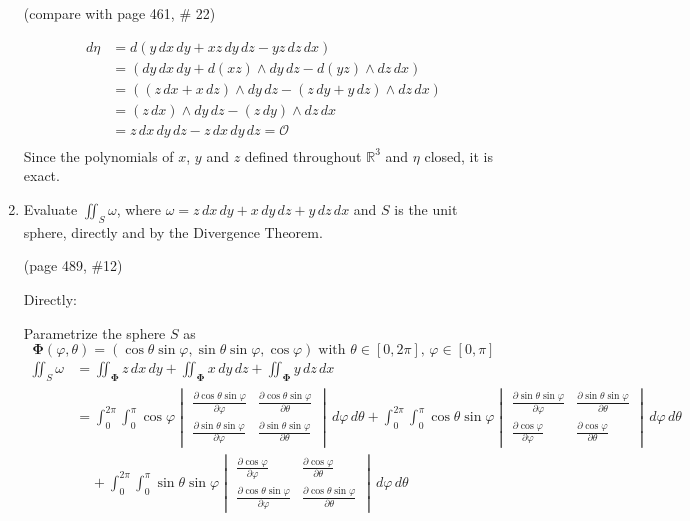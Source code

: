 \documentclass{article}
\newcommand{\partis}[2]{\frac{\partial #2}{\partial #1}}
\begin{document}
\begin{enumerate}
    (compare with page 461, \# 22)

    \begin{align*}
        d\eta &= d (y\, dx \, dy + xz \, dy \, dz - yz \, dz \, dx) \\
        &= (dy \, dx \, dy + d(xz)\wedge  dy \, dz - d(yz) \wedge dz \, dx) \\
        &= ((z \, dx + x \, dz)\wedge  dy \, dz - (z\, dy + y \, dz) \wedge dz \, dx) \\
        &= (z \, dx) \wedge dy \, dz - (z\, dy) \wedge dz \, dx \\
        &= z \, dx \, dy \, dz - z \, dx \, dy \, dz = \mathcal{O}\\
    \end{align*}
    Since the polynomials of $x$, $y$ and $z$ defined throughout $\mathbb{R}^3$ and $\eta$ closed, it is exact.
    \newpage
    \item
    Evaluate $\displaystyle \iint_S \omega$, where $\omega = z\, dx \, dy + x \, dy \, dz + y \, dz \, dx$ and $S$ is the unit sphere, directly and by the Divergence Theorem.

    (page 489, \#12)

    Directly: 
    
    Parametrize the sphere $S$ as 
    \[ \boldsymbol \Phi (\varphi, \theta) = ( \cos\theta \sin\varphi , \sin\theta \sin\varphi, \cos\varphi)\; \text{with }\theta \in [0,2\pi],\, \varphi \in [0,\pi] \]
    \begin{align*}
        \iint_S \omega &= \iint_{\boldsymbol \Phi} z \, dx \, dy + \iint_{\boldsymbol \Phi} x \, dy \, dz + \iint_{\boldsymbol \Phi} y \, dz \, dx \\
        &= \int_0^{2\pi} \int_0^{\pi} \cos \varphi \begin{vmatrix}\partis{\varphi}{\cos\theta \sin \varphi} & \partis{\theta}{\cos\theta \sin \varphi} \\ \partis{\varphi}{\sin\theta \sin\varphi} & \partis{\theta}{\sin\theta \sin\varphi} \end{vmatrix} \, d\varphi \, d\theta + \int_0^{2\pi} \int_0^{\pi} \cos\theta \sin\varphi \begin{vmatrix} \partis{\varphi}{\sin\theta \sin\varphi} & \partis{\theta}{\sin\theta \sin\varphi} \\ \partis{\varphi}{\cos \varphi} & \partis{\theta}{\cos \varphi} \end{vmatrix}\, d\varphi \, d\theta \\
        & \; \; \; \; + \int_0^{2\pi} \int_0^{\pi} \sin\theta \sin\varphi \begin{vmatrix} \partis{\varphi}{\cos \varphi} & \partis{\theta}{\cos \varphi} \\ \partis{\varphi}{\cos\theta \sin\varphi} & \partis{\theta}{\cos\theta \sin\varphi}\end{vmatrix}\, d\varphi \, d\theta \\
    \end{align*}


\end{enumerate}
\end{document}
